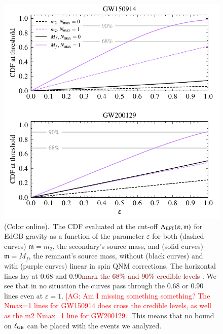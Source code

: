 \documentclass[twocolumn,
               prd,
               aps,
               superscriptaddress,
               tightenlines,
               nofootinbib,
               eqsecnum,
               amsfonts,
               amsmath,
               longbibliography]{revtex4-1}
\newcommand{\gm}{\mathfrak{m}}
\newcommand{\agcomm}[1]{{\textcolor{red}{{[AG: #1]}} }}
\newcommand{\ag}[1]{{\textcolor{Maroon}{{#1}} }}
\begin{document}
\begin{figure}[t]
\includegraphics[width=\columnwidth]{figs/edgb_cdf_varying_threshold.pdf}
\caption{(Color online).~The CDF evaluated at the
cut-off $\Lambda_{\rm EFT}(\varepsilon,\gm)$ for EdGB gravity as a function of the parameter
$\varepsilon$ for both (dashed curves) $\gm = m_2$, the secondary's source
mass, and (solid curves) $\gm = M_{f}$, the remnant's source mass, without
(black curves) and with (purple curves) linear in spin QNM corrections. The
horizontal lines \sout{lay at 0.68 and 0.90}\ag{mark the 68\% and 90\% credible levels}. 
We see that in no situation the curves pass
through the 0.68 or 0.90 lines even at $\varepsilon = 1$.
\agcomm{Am I missing something something? The Nmax=1 lines for GW150914 does 
cross the credible levels, as well as the m2 Nmax=1 line for GW200129.}
%
This means that no bound on $\ell_{\rm GB}$ can be placed with the events we
analyzed.
}
\label{fig:edgb_cdf}
\end{figure}
\end{document}
